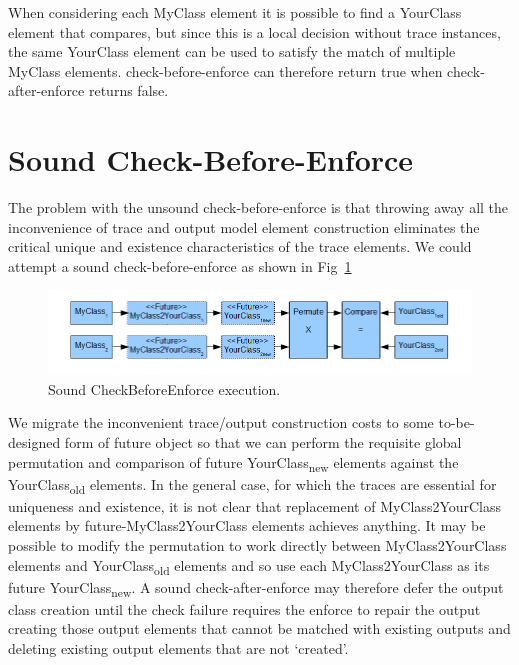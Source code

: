 \documentclass{llncs}
\begin{document}
When considering each MyClass element it is possible to find a YourClass element that compares, but since this is a local decision without trace instances, the same YourClass element can be used to satisfy the match of multiple MyClass elements. check-before-enforce can therefore return true when check-after-enforce returns false.

\section{Sound Check-Before-Enforce}

The problem with the unsound check-before-enforce is that throwing away all the inconvenience of trace and output model element construction eliminates the critical unique and existence characteristics of the trace elements. We could attempt a sound check-before-enforce as shown in Fig~\ref{fig:SoundCheckBeforeEnforce}

\begin{figure}[h]
	\centering
	\includegraphics[width=1.0\textwidth]{SoundCheckBeforeEnforce.png}
	\caption{Sound CheckBeforeEnforce execution.}
	\label{fig:SoundCheckBeforeEnforce}
\end{figure}

We migrate the inconvenient trace/output construction costs to some to-be-designed form of future object so that we can perform the requisite global permutation and comparison of future YourClass\textsubscript{new} elements against the YourClass\textsubscript{old} elements. In the general case, for which the traces are essential for uniqueness and existence, it is not clear that replacement of MyClass2YourClass elements by future-MyClass2YourClass elements achieves anything. It may be possible to modify the permutation to work directly between MyClass2YourClass elements and YourClass\textsubscript{old} elements and so use each MyClass2YourClass as its future YourClass\textsubscript{new}. A sound check-after-enforce may therefore defer the output class creation until the check failure requires the enforce to repair the output creating those output elements that cannot be matched with existing outputs and deleting existing output elements that are not `created'.
\end{document}
